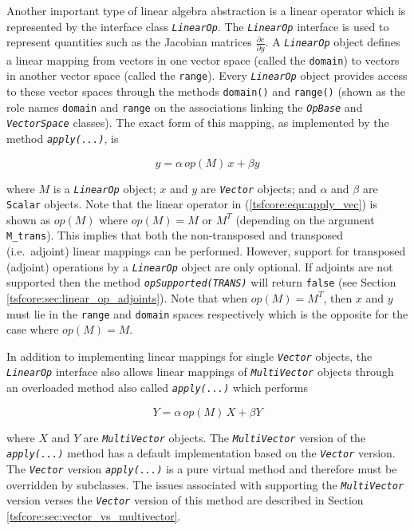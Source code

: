 \documentclass[10pt,fleqn]{article}
\begin{document}
Another important type of linear algebra abstraction is a linear
operator which is represented by the interface class
\texttt{\textit{LinearOp}}.  The \texttt{\textit{LinearOp}} interface
is used to represent quantities such as the Jacobian matrices
$\frac{\partial c}{\partial y}$. A \texttt{\textit{LinearOp}} object
defines a linear mapping from vectors in one vector space (called the
\texttt{domain}) to vectors in another vector space (called the
\texttt{range}).  Every \texttt{\textit{LinearOp}} object provides
access to these vector spaces through the methods \texttt{domain()} and
\texttt{range()} (shown as the role names \texttt{domain} and
\texttt{range} on the associations linking the
\texttt{\textit{OpBase}} and \texttt{\textit{VectorSpace}} classes).
The exact form of this mapping, as implemented by the
method \texttt{\textit{apply(...)}}, is

\begin{equation}
y = \alpha \, op(M) \, x + \beta y
\label{tsfcore:equ:apply_vec}
\end{equation}

where $M$ is a \texttt{\textit{LinearOp}} object; $x$ and $y$ are
\texttt{\textit{Vector}} objects; and $\alpha$ and $\beta$ are \texttt{Scalar}
objects.  Note that the linear operator in (\ref{tsfcore:equ:apply_vec})
is shown as $op(M)$ where $op(M) = M$ or $M^T$ (depending on the
argument \texttt{M\_trans}). This implies that both the non-transposed
and transposed (i.e.~adjoint) linear mappings can be performed.
However, support for transposed (adjoint) operations by a
\texttt{\textit{LinearOp}} object are only optional.  If adjoints are
not supported then the method \texttt{\textit{opSupported(TRANS)}}
will return \texttt{false} (see Section
\ref{tsfcore:sec:linear_op_adjoints}).  Note that when $op(M) = M^T$,
then $x$ and $y$ must lie in the \texttt{range} and
\texttt{domain} spaces respectively which is the opposite for the case
where $op(M) = M$.

In addition to implementing linear mappings for single
\texttt{\textit{Vector}} objects, the
\texttt{\textit{LinearOp}} interface also allows linear mappings of
\texttt{\textit{MultiVector}} objects through an overloaded method
also called \texttt{\textit{apply(...)}} which performs

\begin{equation}
Y = \alpha \, op(M) \, X + \beta Y
\label{tsfcore:equ:apply_multi_vec}
\end{equation}

where $X$ and $Y$ are \texttt{\textit{MultiVector}} objects.  The
\texttt{\textit{MultiVector}} version of the \texttt{\textit{apply(...)}} method has a
default implementation based on the \texttt{\textit{Vector}} version.
The \texttt{\textit{Vector}} version
\texttt{\textit{apply(...)}}  is a pure virtual method and therefore must be
overridden by subclasses.  The issues associated with supporting the
\texttt{\textit{MultiVector}} version verses the \texttt{\textit{Vector}}
version of this method are described in Section
\ref{tsfcore:sec:vector_vs_multivector}.
\end{document}
